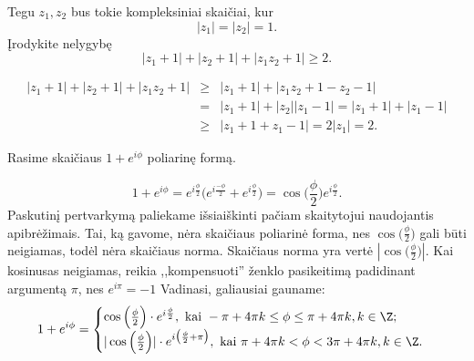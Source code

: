 \begin{pavnr}
Tegu $z_1,z_2$ bus tokie kompleksiniai skaičiai, kur $$|z_1|=|z_2|=1.$$ Įrodykite nelygybę $$|z_1+1|+|z_2+1|+|z_1z_2+1|\geq 2.$$
\end{pavnr}

\begin{sprendimas}
\begin{eqnarray*}
|z_1+1|+|z_2+1|+|z_1z_2+1|&\geq &|z_1+1|+|z_1z_2+1-z_2-1|\\
&=&|z_1+1|+|z_2||z_1-1|=|z_1+1|+|z_1-1|\\
& \geq &|z_1+1+z_1-1|=2|z_1|=2.
\end{eqnarray*}
\end{sprendimas}

\begin{pavnr}
Rasime skaičiaus $1+e^{i\phi}$ poliarinę formą.
\end{pavnr}

\begin{sprendimas}
$$1+e^{i\phi}=e^{i\frac{\phi}{2}}\big(e^{i\frac{-\phi}{2}}+e^{i\frac{\phi}{2}}\big)=\cos\Big(\frac{\phi}{2}\Big)e^{i\frac{\phi}{2}}.$$ Paskutinį pertvarkymą paliekame išsiaiškinti pačiam skaitytojui naudojantis apibrėžimais. Tai, ką gavome, nėra skaičiaus poliarinė forma, nes $\cos\Big(\frac{\phi}{2}\Big)$ gali būti neigiamas, todėl nėra skaičiaus norma. Skaičiaus norma yra vertė $|\cos\Big(\frac{\phi}{2}\Big)|$. Kai kosinusas neigiamas, reikia ,,kompensuoti'' ženklo pasikeitimą padidinant argumentą $\pi$, nes $e^{i\pi}=-1$ Vadinasi, galiausiai gauname:$$1+e^{i\phi}=\begin{cases}
\cos\Big(\frac{\phi}{2}\Big)\cdot e^{i\frac{\phi}{2}}, \text{ kai }-\pi+4\pi k\leq \phi \leq \pi+4\pi k, k\in\Z;\\
|\cos\Big(\frac{\phi}{2}\Big)|\cdot e^{i\big(\frac{\phi}{2}+\pi\big)}, \text{ kai }\pi+4\pi k<\phi<3\pi+4\pi k, k\in\Z.
\end{cases}$$
\end{sprendimas}

